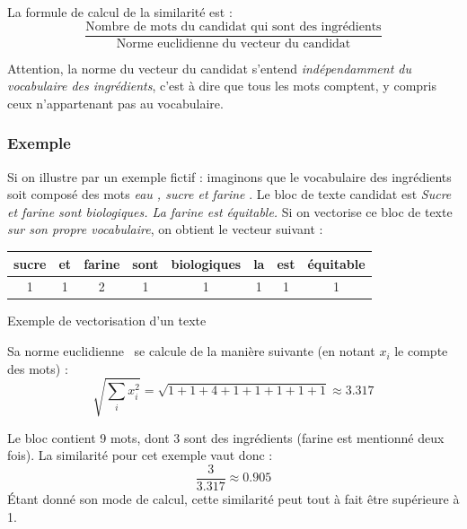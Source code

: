                 La formule de calcul de la similarité est :
                \[\frac{\text{Nombre de mots du candidat qui sont des ingrédients}}{\text{Norme euclidienne du vecteur du candidat}}\]
                
                Attention, la norme du vecteur du candidat s'entend \emph{indépendamment du vocabulaire des ingrédients}, c'est à dire que tous les mots comptent, y compris ceux n'appartenant pas au vocabulaire.

                \subsubsection{Exemple}
                Si on illustre par un exemple fictif : imaginons que le vocabulaire des ingrédients soit composé des mots \emph{\og eau \fg, \og sucre \fg et \og farine \fg}.
                Le bloc de texte candidat est \emph{\og Sucre et farine sont biologiques. La farine est équitable.\fg}
                Si on vectorise ce bloc de texte \emph{sur son propre vocabulaire}, on obtient le vecteur suivant : 

                \bigskip
                \begin{minipage}{\textwidth}
                \captionsetup{type=table}
                \centering
                \begin{tabular}{cccccccc}
                    \toprule
                    sucre & et & farine & sont & biologiques & la & est & équitable \\
                    \midrule
                    1 & 1 & 2 & 1 & 1 & 1 & 1 & 1 \\
                    \bottomrule
                \end{tabular}
                \caption{Exemple de vectorisation d'un texte}
                \bigskip
                \end{minipage}                

                Sa norme euclidienne~\cite{norm_wiki} se calcule de la manière suivante (en notant $x_{i}$ le compte des mots) : 
                \[\sqrt{\sum_{i}^{} x_{i}^{2}} = \sqrt{1 + 1 + 4 + 1 + 1 + 1 + 1 + 1} \approx 3.317\]

                Le bloc contient 9 mots, dont 3 sont des ingrédients (\og farine \fg est mentionné deux fois). La similarité pour cet exemple vaut donc :
                \[\frac{3}{3.317} \approx 0.905\]
                \'{E}tant donné son mode de calcul, cette similarité peut tout à fait être supérieure à 1.

